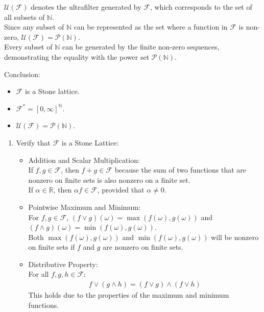 \documentclass{report}
\begin{document}
{\begin{myproof}
\begin{enumerate}
\(\mathcal{U}(\mathcal{F})\) denotes the ultrafilter generated by \(\mathcal{F}\), which corresponds to the set of all subsets of \(\mathbb{N}\).\\
Since any subset of \(\mathbb{N}\) can be represented as the set where a function in \(\mathcal{F}\) is non-zero, \(\mathcal{U}(\mathcal{F}) = \mathcal{P}(\mathbb{N})\).\\
Every subset of \(\mathbb{N}\) can be generated by the finite non-zero sequences, demonstrating the equality with the power set \(\mathcal{P}(\mathbb{N})\).
    \end{enumerate}
Conclusion:
\begin{itemize}
\item \(\mathcal{F}\) is a Stone lattice.
\item \(\mathcal{F}^* = [0, \infty]^\mathbb{N}\).
\item \(\mathcal{U}(\mathcal{F}) = \mathcal{P}(\mathbb{N})\).
\end{itemize}
\end{myproof}
\begin{myproof}
\begin{enumerate}
\item Verify that \(\mathcal{F}\) is a Stone Lattice:
\begin{itemize}
    \item Addition and Scalar Multiplication:\\
If \(f, g \in \mathcal{F}\), then \(f + g \in \mathcal{F}\) because the sum of two functions that are nonzero on finite sets is also nonzero on a finite set.\\
If \(\alpha \in \mathbb{R}\), then \(\alpha f \in \mathcal{F}\), provided that \(\alpha \neq 0\).
\item Pointwise Maximum and Minimum:\\
For \(f, g \in \mathcal{F}\), \((f \vee g)(\omega) = \max(f(\omega), g(\omega))\) and \((f \wedge g)(\omega) = \min(f(\omega), g(\omega))\).\\
Both \(\max(f(\omega), g(\omega))\) and \(\min(f(\omega), g(\omega))\) will be nonzero on finite sets if \(f\) and \(g\) are nonzero on finite sets.
\item Distributive Property:\\
For all \(f, g, h \in \mathcal{F}\):
     \begin{align*}
         f \vee (g \wedge h) = (f \vee g) \wedge (f \vee h)
     \end{align*}
     This holds due to the properties of the maximum and minimum functions.


\end{itemize}
\end{enumerate}
\end{myproof}}
\end{document}
